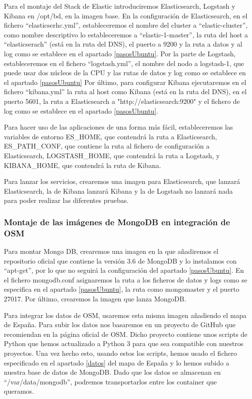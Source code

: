 Para el montaje del Stack de Elastic introduciremos Elasticsearch, Logstash y Kibana en /opt/bd, en la imagen base. En la configuración de Elasticsearch, en el fichero “elasticserhc.yml”, estableceremos el nombre del cluster a “elastic-cluster”, como nombre descriptivo lo estableceremos a “elastic-1-master”, la ruta del host a “elasticserach” (está en la ruta del DNS), el puerto a 9200 y la ruta a datos y al log como se establece en el apartado \ref{pasosUbuntu}. Por la parte de Logstash, estableceremos en el fichero “logstash.yml”, el nombre del nodo a logstash-1, que puede usar dos núcleos de la CPU y las rutas de datos y log como se establece en el apartado \ref{pasosUbuntu} Por último, para configurar Kibana ejecutaremos en el fichero “kibana.yml” la ruta al host como Kibana (está en la ruta del DNS), en el puerto 5601, la ruta a Elasticsearch a "http://elasticsearch:9200" y el fichero de log como se establece en el apartado \ref{pasosUbuntu}.\par

Para hacer uso de las aplicaciones de una forma más fácil, estableceremos las variables de entorno ES\_HOME, que contendrá la ruta a Elasticsearch, ES\_PATH\_CONF, que contiene la ruta al fichero de configuración a Elasticsearch, LOGSTASH\_HOME, que contendrá la ruta a Logstash, y KIBANA\_HOME, que contendrá la ruta de Kibana.\par
Para lanzar los servicios, crearemos una imagen para Elasticsearch, que lanzará Elasticsearch, la de Kibana lanzará Kibana y la de Logstash no lanzará nada para poder realizar las diferentes pruebas.\par

\subsubsection {Montaje de las imágenes de MongoDB en integración de OSM\label{montMongo}}
Para montar Mongo DB, crearemos una imagen en la que añadiremos el repositorio oficial que contiene la versión 3.6 de MongoDB y lo instalamos con “apt-get”, por lo que no seguirá la configuración del apartado \ref{pasosUbuntu}. En el fichero mongodb.conf asignaremos la ruta a los ficheros de datos y logs como se especifica en el apartado \ref{pasosUbuntu}, la ruta como mongomaster y el puerto 27017. Por último, crearemos la imagen que lanza MongoDB.\par

Para integrar los datos de OSM, usaremos esta misma imagen añadiendo el mapa de España. Para subir los datos nos basaremos en un proyecto de GitHub que recomiendan en la página oficial de OSM. Dicho proyecto contiene unos scripts de Python que hemos actualizado a Python 3 para que sea compatible con nuestros proyectos. Una vez hecho esto, usando estos los scripts, hemos usado el fichero especificado en el apartado \ref{datos} del mapa de España y lo hemos subido a nuestra base de datos de MongoDB. Dado que los datos se almacenan en “/var/data/mongodb”, podremos transportarlos entre los container que queramos.\par

